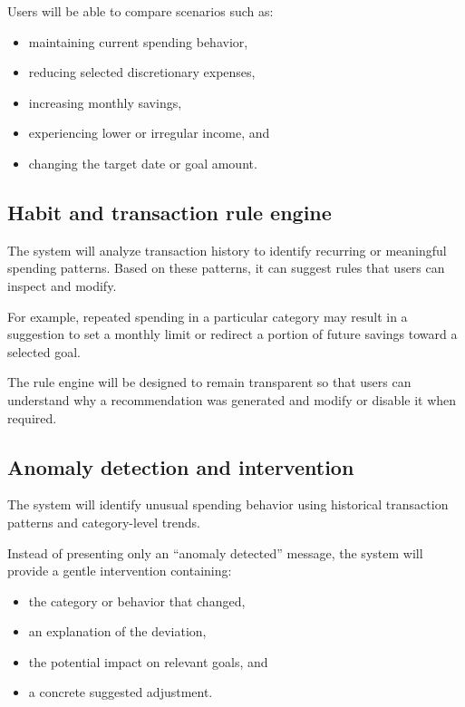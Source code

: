 \documentclass[11pt,a4paper]{article}
\begin{document}
Users will be able to compare scenarios such as:

\begin{itemize}[leftmargin=0.7cm]
    \item maintaining current spending behavior,
    \item reducing selected discretionary expenses,
    \item increasing monthly savings,
    \item experiencing lower or irregular income, and
    \item changing the target date or goal amount.
\end{itemize}


\subsection{Habit and transaction rule engine}

The system will analyze transaction history to identify recurring or
meaningful spending patterns. Based on these patterns, it can suggest rules
that users can inspect and modify.

For example, repeated spending in a particular category may result in a
suggestion to set a monthly limit or redirect a portion of future savings
toward a selected goal.

The rule engine will be designed to remain transparent so that users can
understand why a recommendation was generated and modify or disable it when
required.


\subsection{Anomaly detection and intervention}

The system will identify unusual spending behavior using historical
transaction patterns and category-level trends.

Instead of presenting only an ``anomaly detected'' message, the system will
provide a gentle intervention containing:

\begin{itemize}[leftmargin=0.7cm]
    \item the category or behavior that changed,
    \item an explanation of the deviation,
    \item the potential impact on relevant goals, and
    \item a concrete suggested adjustment.
\end{itemize}
\end{document}
